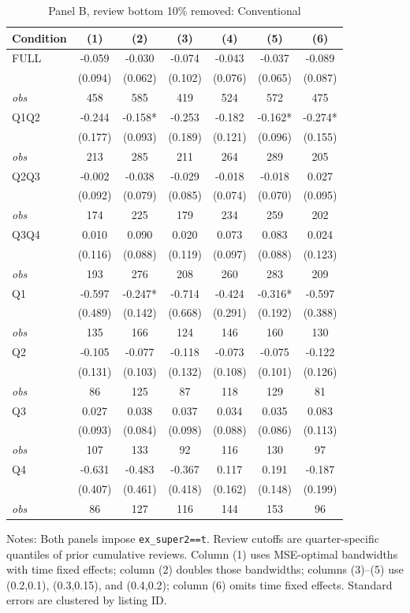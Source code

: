 \begin{table}[!htbp]
\centering
\caption{Panel B, review bottom 10\% removed: Conventional}
\begin{tabular}{lcccccc}
\toprule
Condition & (1) & (2) & (3) & (4) & (5) & (6) \\
\midrule
FULL & -0.059 & -0.030 & -0.074 & -0.043 & -0.037 & -0.089 \\
 & (0.094) & (0.062) & (0.102) & (0.076) & (0.065) & (0.087) \\
\textit{obs} & 458 & 585 & 419 & 524 & 572 & 475 \\
Q1Q2 & -0.244 & -0.158* & -0.253 & -0.182 & -0.162* & -0.274* \\
 & (0.177) & (0.093) & (0.189) & (0.121) & (0.096) & (0.155) \\
\textit{obs} & 213 & 285 & 211 & 264 & 289 & 205 \\
Q2Q3 & -0.002 & -0.038 & -0.029 & -0.018 & -0.018 & 0.027 \\
 & (0.092) & (0.079) & (0.085) & (0.074) & (0.070) & (0.095) \\
\textit{obs} & 174 & 225 & 179 & 234 & 259 & 202 \\
Q3Q4 & 0.010 & 0.090 & 0.020 & 0.073 & 0.083 & 0.024 \\
 & (0.116) & (0.088) & (0.119) & (0.097) & (0.088) & (0.123) \\
\textit{obs} & 193 & 276 & 208 & 260 & 283 & 209 \\
Q1 & -0.597 & -0.247* & -0.714 & -0.424 & -0.316* & -0.597 \\
 & (0.489) & (0.142) & (0.668) & (0.291) & (0.192) & (0.388) \\
\textit{obs} & 135 & 166 & 124 & 146 & 160 & 130 \\
Q2 & -0.105 & -0.077 & -0.118 & -0.073 & -0.075 & -0.122 \\
 & (0.131) & (0.103) & (0.132) & (0.108) & (0.101) & (0.126) \\
\textit{obs} & 86 & 125 & 87 & 118 & 129 & 81 \\
Q3 & 0.027 & 0.038 & 0.037 & 0.034 & 0.035 & 0.083 \\
 & (0.093) & (0.084) & (0.098) & (0.088) & (0.086) & (0.113) \\
\textit{obs} & 107 & 133 & 92 & 116 & 130 & 97 \\
Q4 & -0.631 & -0.483 & -0.367 & 0.117 & 0.191 & -0.187 \\
 & (0.407) & (0.461) & (0.418) & (0.162) & (0.148) & (0.199) \\
\textit{obs} & 86 & 127 & 116 & 144 & 153 & 96 \\
\bottomrule
\end{tabular}
\begin{minipage}{0.98\textwidth}\footnotesize
Notes: Both panels impose \texttt{ex\_super2==t}. Review cutoffs are quarter-specific quantiles of prior cumulative reviews. Column (1) uses MSE-optimal bandwidths with time fixed effects; column (2) doubles those bandwidths; columns (3)--(5) use (0.2,0.1), (0.3,0.15), and (0.4,0.2); column (6) omits time fixed effects. Standard errors are clustered by listing ID.
\end{minipage}
\end{table}


